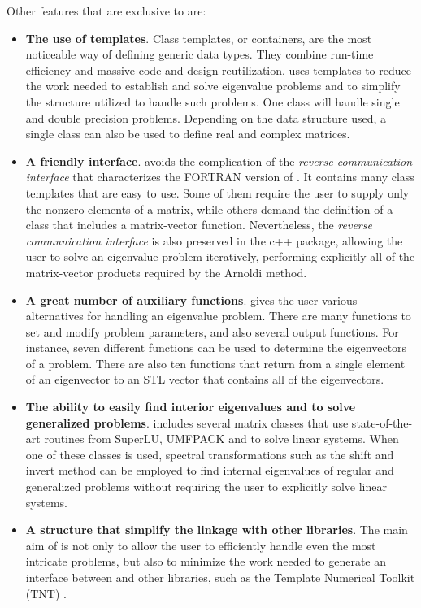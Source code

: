 Other features that are exclusive to \ARPP{} are:

\begin{itemize}
	\item \textbf{The use of templates}. Class templates, or containers, are the most noticeable way of defining generic data types. They combine run-time efficiency and massive code and design reutilization. \ARPP{} uses templates to reduce the work needed to establish and solve eigenvalue problems and to simplify the structure utilized to handle such problems. One class will handle single and double precision problems. Depending on the data structure used, a single class can also be used to define real and complex matrices.
	\item \textbf{A friendly interface}. \ARPP{} avoids the complication of the \textit{reverse communication interface} that characterizes the FORTRAN version of \ARP{}. It contains many class templates that are easy to use. Some of them require the user to supply only the nonzero elements of a matrix, while others demand the definition of a class that includes a matrix-vector function. Nevertheless, the \textit{reverse communication interface} is also preserved in the c++ package, allowing the user to solve an eigenvalue problem iteratively, performing explicitly all of the matrix-vector products required by the Arnoldi method.
	\item \textbf{A great number of auxiliary functions}. \ARPP{} gives the user various alternatives for handling an eigenvalue problem. There are many functions to set  and modify problem parameters, and also several output functions. For instance, seven different functions can be used to determine the eigenvectors of a problem. There are also ten functions that return from a single element of an eigenvector to an STL vector that contains all of the eigenvectors.
	\item \textbf{The ability to easily find interior eigenvalues and to solve generalized problems}. \ARPP{} includes several matrix classes that use state-of-the-art routines from SuperLU, UMFPACK and \LAP{} to solve linear systems. When one of these classes is used, spectral transformations such as the shift and invert method can be employed to find internal eigenvalues of regular and generalized problems without requiring the user to explicitly solve linear systems.
	\item \textbf{A structure that simplify the linkage with other libraries}. The main aim of  \ARPP{} is not only to allow the user to efficiently handle even the most intricate problems, but also to minimize the work needed to generate an interface between \ARP{} and other libraries, such as the Template Numerical Toolkit (TNT) \cite{T:9}.
\end{itemize}

